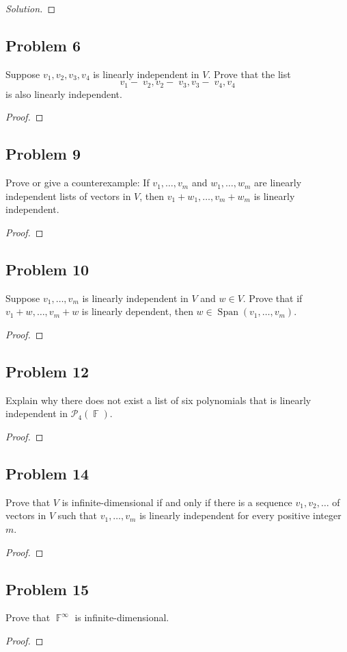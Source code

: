 \documentclass[letterpaper, 12pt]{amsart}
\DeclareMathOperator{\F}{\mathbb{F}}				%
\DeclareMathOperator{\Span}{Span}					%
\theoremstyle{definition}  							%
\begin{document}
		\begin{proof}[Solution]
		\end{proof}

		\subsection*{Problem 6}	
		Suppose $v_{1}, v_{2}, v_{3}, v_{4}$ is linearly independent in $V$. 
		Prove that the list $$v_{1} - 􏰋v_{2}, v_{2} - 􏰋v_{3}, v_{3} - 􏰋v_{4}, v_{4}$$ is also linearly independent.

		\begin{proof}
		\end{proof}

		\subsection*{Problem 9}
		Prove or give a counterexample: If $v_{1}, \dots, v_{m}$ and $w_{1}, \dots, w_{m}$ are linearly independent lists of vectors in $V$, then $v_{1} + w_{1}, \dots, v_{m} + w_{m}$ is linearly independent.

		\begin{proof}
		\end{proof}

		\subsection*{Problem 10}
		Suppose $v_{1}, \dots, v_{m}$ is linearly independent in $V$ and $w \in V$. 
		Prove that if $v_{1} + w, \dots, v_{m} + w$ is linearly dependent, then $w \in \Span(v_{1}, \dots, v_{m})$.

		\begin{proof}
		\end{proof}

		\subsection*{Problem 12}
		Explain why there does not exist a list of six polynomials that is linearly independent in $\mathcal{P}_{4}(\F)$.

		\begin{proof}
		\end{proof}

		\subsection*{Problem 14}
		Prove that $V$ is infinite-dimensional if and only if there is a sequence $v_{1}, v_{2}, \dots$ of vectors in $V$ such that $v_{1}, \dots, v_{m}$ is linearly independent for every positive integer $m$.

		\begin{proof}
		\end{proof}

		\subsection*{Problem 15}
		Prove that $\F^{\infty}$ is infinite-dimensional.

		\begin{proof}
		\end{proof}
\end{document}
